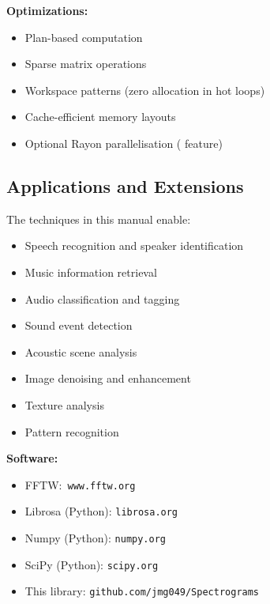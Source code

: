 \textbf{Optimizations:}
\begin{itemize}
  \item Plan-based computation
  \item Sparse matrix operations
  \item Workspace patterns (zero allocation in hot loops)
  \item Cache-efficient memory layouts
  \item Optional Rayon parallelisation ( feature)
\end{itemize}

\subsection{Applications and Extensions}

The techniques in this manual enable:

\begin{itemize}
  \item Speech recognition and speaker identification
  \item Music information retrieval
  \item Audio classification and tagging
  \item Sound event detection
  \item Acoustic scene analysis
  \item Image denoising and enhancement
  \item Texture analysis
  \item Pattern recognition
\end{itemize}

\textbf{Software:}
\begin{itemize}
  \item FFTW:\ \texttt{www.fftw.org}
  \item Librosa (Python): \texttt{librosa.org}
  \item Numpy (Python): \texttt{numpy.org}
  \item SciPy (Python): \texttt{scipy.org}
  \item This library: \texttt{github.com/jmg049/Spectrograms}
\end{itemize}
\clearpage

